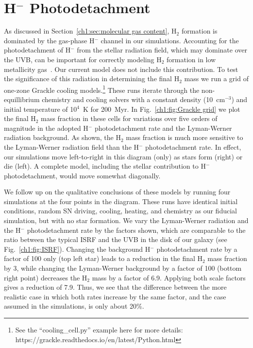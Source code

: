 \section{H$^{-}$ Photodetachment}
\label{appendix:H minus}

As discussed in Section~\ref{ch1:sec:molecular gas content}, H$_2$ formation is dominated by the gas-phase H$^{-}$ channel in our simulations. Accounting for the photodetachment of H$^{-}$ from the stellar radiation field, which may dominate over the UVB, can be important for correctly modeling H$_2$ formation in low metallicity gas~\citep{Wolcott-Green2012}. Our current model does not include this contribution. To test the significance of this radiation in determining the final H$_2$ mass we run a grid of one-zone Grackle cooling models.\footnote{See the ``cooling\_cell.py'' example here for more details: https://grackle.readthedocs.io/en/latest/Python.html}  These runs iterate through the non-equillibrium chemistry and cooling solvers with a constant density (10~cm$^{-3}$) and initial temperature of 10$^{4}$~K for 200~Myr. In Fig.~\ref{ch1:fig:Grackle grid} we plot the final H$_2$ mass fraction in these cells for variations over five orders of magnitude in the adopted H$^{-}$ photodetachment rate and the Lyman-Werner radiation background. As shown, the H$_2$ mass fraction is much more sensitive to the Lyman-Werner radiation field than the H$^-$ photodetachment rate. In effect, our simulations move left-to-right in this diagram (only) as stars form (right) or die (left). A complete model, including the stellar contribution to H$^{-}$ photodetachment, would move somewhat diagonally.

We follow up on the qualitative conclusions of these models by running four simulations at the four points in the diagram. These runs have identical initial conditions, random SN driving, cooling, heating, and chemistry as our fiducial simulation, but with no star formation. We vary the Lyman-Werner radiation and the H$^{-}$ photodetachment rate by the factors shown, which are comparable to the ratio between the typical ISRF and the UVB in the disk of our galaxy (see Fig.~\ref{ch1:fig:ISRF}). Changing the background H$^{-}$ photodetachment rate by a factor of 100 only (top left star) leads to a reduction in the final H$_2$ mass fraction by 3, while changing the Lyman-Werner background by a factor of 100 (bottom right point) decreases the H$_2$ mass by a factor of 6.9. Applying both scale factors gives a reduction of 7.9. Thus, we see that the difference between the more realistic case in which both rates increase by the same factor, and the case assumed in the simulations, is only about 20\%.

